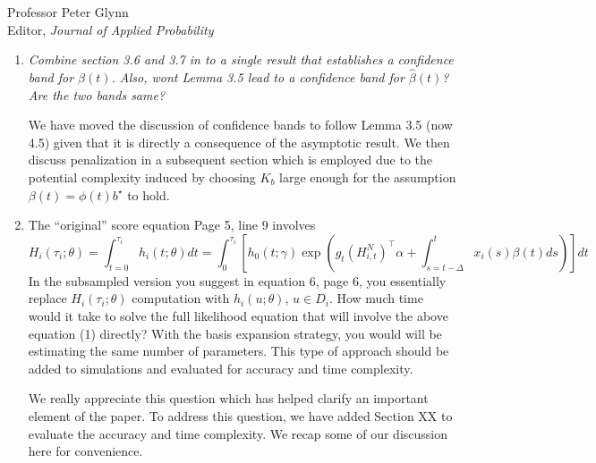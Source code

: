 \documentclass[11pt]{letter} %
\begin{document}
\begin{letter}{Professor
	Peter Glynn\\
	Editor, {\em Journal of Applied Probability}}
\begin{enumerate}
\vspace{5mm}
We have now included the statement of how we define optimality in the main paper to make the theorem statement clear.  Specifically, we view weights $w^\star$ as optimal if the difference between the asympotic variance~$V (\theta_0; w^\star)$ and the asymptotic variance under any other choice of weights~$w$, $V(\theta_0; w)$ is postivie semi-definite. The proof is kept in the supplementary materials for conciseness.
\vspace{5mm}

\item {\it Combine section 3.6 and 3.7 in to a single result that establishes a confidence band for $\beta (t)$. Also, wont Lemma 3.5 lead to a confidence band for $\hat \beta (t)$? Are the two bands same?}

\vspace{5mm}
We have moved the discussion of confidence bands to follow Lemma 3.5 (now 4.5) given that it is directly a consequence of the asymptotic result.  We then  discuss penalization in a subsequent section which is employed due to the potential complexity induced by choosing $K_b$ large enough for the assumption $\beta (t) =\phi (t) b^\star$ to hold.
\vspace{5mm}

\item The ``original'' score equation Page 5, line 9 involves
$$
H_i (\tau_i ;\theta) = \int_{t=0}^{\tau_i} h_i (t; \theta)dt = \int_0^{\tau_i} \left[ h_0 (t;\gamma) \exp \left( g_t (H_{i,t}^N)^\top \alpha + \int_{s=t-\Delta}^t x_i (s) \beta(t) ds \right) \right] dt
$$
In the subsampled version you suggest in equation 6, page 6, you essentially replace $H_i (\tau_i; \theta)$ computation with $h_i (u; \theta)$, $u \in D_i$. How much time would it take to solve the full likelihood equation that will involve the above equation (1) directly? With the basis expansion strategy, you
would will be estimating the same number of parameters. This type of approach should be added to simulations and evaluated for accuracy and time complexity.

\vspace{5mm}
We really appreciate this question which has helped clarify an important element of the paper.  To address this question, we have added Section XX to evaluate the accuracy and time complexity.  We recap some of our discussion here for convenience.
\vspace{5mm}


\end{enumerate}
\end{letter}
\end{document}
